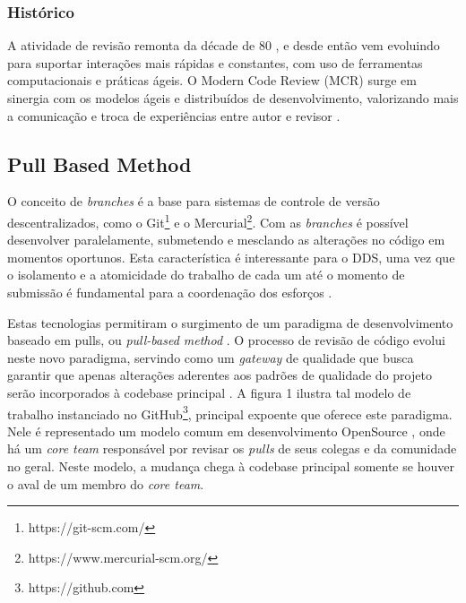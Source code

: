 \documentclass[sigconf]{acmart}
\begin{document}
\subsubsection{Histórico}\label{sec:historico}
  A atividade de revisão remonta da décade de 80 \cite{Fagan1976}, e desde então vem evoluindo para suportar interações mais rápidas e constantes, com uso de ferramentas computacionais e práticas ágeis. O Modern Code Review (MCR) surge em sinergia com os modelos ágeis e distribuídos de desenvolvimento, valorizando mais a comunicação e troca de experiências entre autor e revisor \cite{Bacchelli2013}.

\subsection{Pull Based Method}\label{sec:pull_based}
  O conceito de \textit{branches} é a base para sistemas de controle de versão descentralizados, como o  Git\footnote{https://git-scm.com/} e o Mercurial\footnote{https://www.mercurial-scm.org/}. Com as \textit{branches} é possível desenvolver paralelamente, submetendo e mesclando as alterações no código em momentos oportunos. Esta característica é interessante para o DDS, uma vez que o isolamento e a atomicidade do trabalho de cada um até o momento de submissão é fundamental para a coordenação dos esforços \cite{barr2012}.

  Estas tecnologias permitiram o surgimento de um paradigma de desenvolvimento baseado em pulls, ou \textit{pull-based method} \cite{gousios2014}. O processo de revisão de código evolui neste novo paradigma, servindo como um \textit{gateway} de qualidade que busca garantir que apenas alterações aderentes aos padrões de qualidade do projeto serão incorporados à codebase principal \cite{gousios2015}. A figura 1 ilustra tal modelo de trabalho instanciado no GitHub\footnote{https://github.com}, principal expoente que oferece este paradigma. Nele é representado um modelo comum em desenvolvimento OpenSource \cite{6385140}, onde há um \textit{core team} responsável por revisar os \textit{pulls} de seus colegas e da comunidade no geral. Neste modelo, a mudança chega à codebase principal somente se houver o aval de um membro do \textit{core team}.
\end{document}

